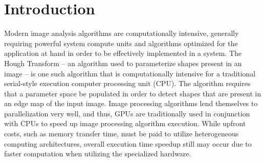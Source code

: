 \documentclass[conference]{IEEEtran}
\begin{document}
\section*{Introduction}
Modern image analysis algorithms are computationally intensive, generally requiring powerful system compute units and algorithms optimized for the application at hand in order to be effectively implemented in a system. The Hough Transform \~\cite{BALLARD1981111} – an algorithm used to parameterize shapes present in an image – is one such algorithm that is computationally intensive for a traditional serial-style execution computer processing unit (CPU). The algorithm requires that a parameter space be populated in order to detect shapes that are present in an edge map of the input image. Image processing algorithms lend themselves to parallelization very well, and thus, GPUs are traditionally used in conjunction with CPUs to speed up image processing algorithm execution. While upfront costs, such as memory transfer time, must be paid to utilize heterogeneous computing architectures, overall execution time speedup still may occur due to faster computation when utilizing the specialized hardware.











% 

\end{document}
